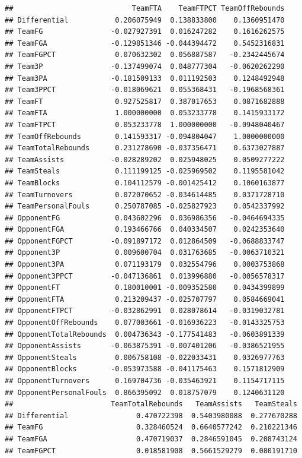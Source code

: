 \documentclass[]{book}
\begin{document}
\begin{verbatim}
##                            TeamFTA    TeamFTPCT TeamOffRebounds
## Differential           0.206075949  0.138833800    0.1360951470
## TeamFG                -0.027927391  0.016247282    0.1616262575
## TeamFGA               -0.129851346 -0.044394472    0.5452316831
## TeamFGPCT              0.070632302  0.056887587   -0.2342445674
## Team3P                -0.137499074  0.048777304   -0.0620262290
## Team3PA               -0.181509133  0.011192503    0.1248492948
## Team3PPCT             -0.018069621  0.055368431   -0.1968568361
## TeamFT                 0.927525817  0.387017653    0.0871682888
## TeamFTA                1.000000000  0.053233778    0.1415933172
## TeamFTPCT              0.053233778  1.000000000   -0.0948040467
## TeamOffRebounds        0.141593317 -0.094804047    1.0000000000
## TeamTotalRebounds      0.231278690 -0.037356471    0.6373027887
## TeamAssists           -0.028289202  0.025948025    0.0509277222
## TeamSteals             0.111199125 -0.025969502    0.1195581042
## TeamBlocks             0.104112579 -0.001425412    0.1060163877
## TeamTurnovers          0.072070652 -0.034614485    0.0371728710
## TeamPersonalFouls      0.250787085 -0.025827923    0.0542337992
## OpponentFG             0.043602296  0.036986356   -0.0464694335
## OpponentFGA            0.193466766  0.040334507    0.0242353640
## OpponentFGPCT         -0.091897172  0.012864509   -0.0688833747
## Opponent3P             0.009600704  0.031763685   -0.0063710321
## Opponent3PA            0.071193179  0.032554796    0.0003753868
## Opponent3PPCT         -0.047136861  0.013996880   -0.0056578317
## OpponentFT             0.180010001 -0.009352580    0.0434399899
## OpponentFTA            0.213209437 -0.025707797    0.0584669041
## OpponentFTPCT         -0.032862991  0.028078614   -0.0319032781
## OpponentOffRebounds    0.077003661 -0.016936223   -0.0143325753
## OpponentTotalRebounds  0.004736343 -0.177541483   -0.0603891339
## OpponentAssists       -0.063875391 -0.007401206   -0.0386521955
## OpponentSteals         0.006758108 -0.022033431    0.0326977763
## OpponentBlocks        -0.053973588 -0.041175463    0.1571812909
## OpponentTurnovers      0.169704736 -0.035463921    0.1154717115
## OpponentPersonalFouls  0.866395092  0.018757079    0.1240631120
##                       TeamTotalRebounds   TeamAssists   TeamSteals
## Differential                0.470722398  0.5403980088  0.277670288
## TeamFG                      0.328460524  0.6640577242  0.210221346
## TeamFGA                     0.470719037  0.2846591045  0.208743124
## TeamFGPCT                   0.018581908  0.5661529279  0.080191710

\end{verbatim}
\end{document}
